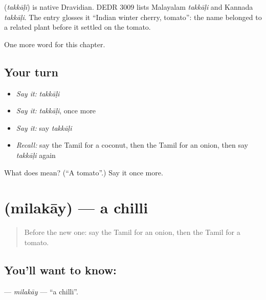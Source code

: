 \begin{cousinweb}
\textbf{} (\emph{takkāḷi}) is native Dravidian. DEDR 3009 lists Malayalam \emph{takkāḷi} and Kannada \emph{takkāḷi}. The entry glosses it \textquotedblleft{}Indian winter cherry, tomato\textquotedblright{}: the name belonged to a related plant before it settled on the tomato.
\end{cousinweb}

\begin{grammarlens}[title={What you've built}]
One more word for this chapter.
\end{grammarlens}

\subsection*{Your turn}
\begin{itemize}
\raggedright
  \item \emph{Say it:} \emph{takkāḷi}
  \item \emph{Say it:} \emph{takkāḷi}, once more
  \item \emph{Say it:} say \emph{takkāḷi}
  \item \emph{Recall:} say the Tamil for a coconut, then the Tamil for an onion, then say \emph{takkāḷi} again
\end{itemize}

\begin{tcolorbox}[breakable,colback=teal!4,colframe=teal!35!black,title={Before you move on}]
What does  mean? (\textquotedblleft{}A tomato\textquotedblright{}.) Say it once more.
\end{tcolorbox}
\section[\texorpdfstring{\ta{மிளகாய்} (milakāy)}{மிளகாய் (milakāy)}]{ (milakāy) — a chilli}

\label{lesson:TA-C124-milakay}



\begin{quote}
Before the new one: say the Tamil for an onion, then the Tamil for a tomato.
\end{quote}

\subsection*{You'll want to know: }
\textbf{} — \emph{milakāy} — \textquotedblleft{}a chilli\textquotedblright{}.

